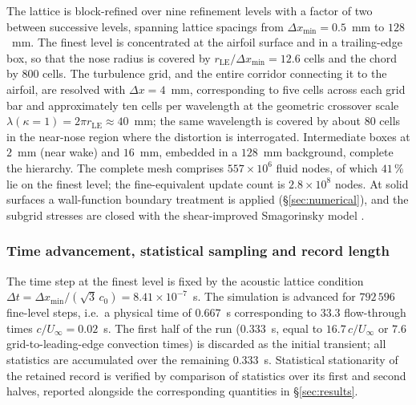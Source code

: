 \documentclass[lineno]{JFM-FLM_Au}
\begin{document}
The lattice is block-refined over nine refinement levels with a
factor of two between successive levels, spanning lattice spacings
from $\Delta x_{\min} = 0.5$~mm to $128$~mm. The finest level is
concentrated at the airfoil surface and in a trailing-edge box, so
that the nose radius is covered by
$r_{\mathrm{LE}}/\Delta x_{\min} = 12.6$ cells and the chord by $800$
cells. The turbulence grid, and the entire corridor connecting it to
the airfoil, are resolved with $\Delta x = 4$~mm, corresponding to
five cells across each grid bar and approximately ten cells per
wavelength at the geometric crossover scale
$\lambda(\kappa{=}1) = 2\pi r_{\mathrm{LE}} \approx 40$~mm; the same
wavelength is covered by about $80$ cells in the near-nose region
where the distortion is interrogated. Intermediate boxes at $2$~mm
(near wake) and $16$~mm, embedded in a $128$~mm background, complete
the hierarchy. The complete mesh comprises $557\times10^{6}$ fluid
nodes, of which $41\,\%$ lie on the finest level; the fine-equivalent
update count is $2.8\times10^{8}$ nodes. At solid surfaces a
wall-function boundary treatment is applied
(\S\ref{sec:numerical}), and the subgrid stresses are closed with the
shear-improved Smagorinsky model \citep{Leveque2007}.

\subsubsection{Time advancement, statistical sampling and record
length}

The time step at the finest level is fixed by the acoustic lattice
condition $\Delta t = \Delta x_{\min}/(\sqrt{3}\,c_0)
= 8.41\times10^{-7}$~s. The simulation is advanced for
$792\,596$ fine-level steps, i.e.\ a physical time of $0.667$~s
corresponding to $33.3$ flow-through times $c/U_{\infty} = 0.02$~s.
The first half of the run ($0.333$~s, equal to $16.7\,c/U_{\infty}$
or $7.6$ grid-to-leading-edge convection times) is discarded as the
initial transient; all statistics are accumulated over the remaining
$0.333$~s. Statistical stationarity of the retained record is
verified by comparison of statistics over its first and second
halves, reported alongside the corresponding quantities in
\S\ref{sec:results}.
\end{document}
